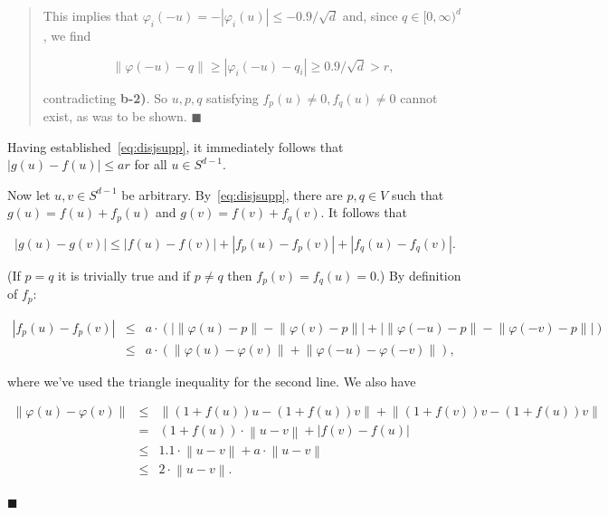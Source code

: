\documentclass[11pt]{article}%
\newenvironment{proof}{\vspace{1ex}\noindent{\bf Proof.}}{\hspace*{\fill}$\blacksquare$\vspace{1ex}}
\newenvironment{proofof}[1]{\vspace{1ex}\noindent{\bf Proof of #1.}}{\hspace*{\fill}$\blacksquare$\vspace{1ex}}
\newcommand{\norm}[1]{\ensuremath{\left\|#1\right\|}}
\begin{document}
\begin{proof}
\begin{quote}
\begin{proofof}{\eqref{eq:disjsupp}}
\noindent
This implies that $\varphi_i(-u) = - |\varphi_i(u)| \leq -0.9/\sqrt{d}$ and, since $q \in [0,\infty)^d$, 
we find

$$ \norm{\varphi(-u)-q} \geq |\varphi_i(-u)-q_i| \geq 0.9/\sqrt{d} > r, $$

\noindent
contradicting {\bf b-2)}.
So $u,p,q$ satisfying $f_p(u) \neq 0, f_q(u) \neq 0$ cannot exist, as was to be shown.
\end{proofof}\end{quote}

\noindent 
Having established~\eqref{eq:disjsupp}, it immediately follows that 
$|g(u)-f(u)| \leq a r$ for all $u \in S^{d-1}$.


Now let $u,v \in S^{d-1}$ be arbitrary. By~\eqref{eq:disjsupp}, there are $p,q \in V$ such 
that $g(u) = f(u) + f_p(u)$ and $g(v) = f(v) + f_q(v)$.
It follows that 

\begin{equation}\label{eq:gugv} |g(u)-g(v)| \leq 
|f(u)-f(v)| + |f_p(u)-f_p(v)| + |f_q(u)-f_q(v)|.
\end{equation}

\noindent 
(If $p=q$ it is trivially true and if $p\neq q$ then $f_p(v)=f_q(u)=0$.)
By definition of $f_p$:

\begin{equation}\label{eq:fpufpv}
\begin{array}{rcl} 
|f_p(u)-f_p(v)| 
& \leq & 
a \cdot \left( \left| \norm{\varphi(u)-p} - \norm{\varphi(v)-p} \right| 
+ \left| \norm{\varphi(-u)-p} - \norm{\varphi(-v)-p} \right| \right) \\
& \leq & 
a \cdot \left( \norm{\varphi(u)-\varphi(v)} + \norm{\varphi(-u)-\varphi(-v)} \right), 
\end{array}
\end{equation}

\noindent
where we've used the triangle inequality for the second line.
We also have

$$ \begin{array}{rcl} 
\norm{\varphi(u)-\varphi(v)} 
& \leq & 
\norm{ (1+f(u)) u - (1+f(u)) v} + \norm{(1+f(v))v-(1+f(u))v} \\
& = & 
(1+f(u)) \cdot \norm{u-v} + |f(v)-f(u)| \\
& \leq &  
1.1 \cdot \norm{u-v} + a\cdot \norm{u-v} \\
& \leq & 
2 \cdot \norm{u-v}. 
\end{array} $$


\end{proof}
\end{document}
